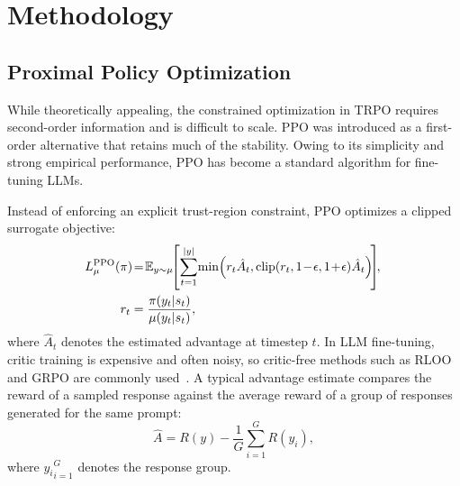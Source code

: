 \section{Methodology}  
\label{sec:method}  

\subsection{Proximal Policy Optimization}  

While theoretically appealing, the constrained optimization in TRPO requires second-order information and is difficult to scale. PPO \citep{schulman2017proximal} was introduced as a first-order alternative that retains much of the stability. Owing to its simplicity and strong empirical performance, PPO has become a standard algorithm for fine-tuning LLMs.

Instead of enforcing an explicit trust-region constraint, PPO optimizes a clipped surrogate objective:
\begin{align}    
\! L^{\mathrm{PPO}}_{\rolloutpi}({\trainerpi}) \! &= \! \mathbb{E}_{y \sim \rolloutpi} \!\! \left[ \sum_{t=1}^{|y|} \! \min \! \left( r_t \hat{A}_t, \operatorname{clip}(r_t, 1 \! - \! \epsilon, 1 \! + \! \epsilon) \hat{A}_t \right) \! \right] \!\!, \nonumber \\
r_t &= \frac{\trainerpi(y_t | s_t)}{\rolloutpi(y_t | s_t)},
\label{eq:ppo-clip}
\end{align}    
where $\hat{A}_t$ denotes the estimated advantage at timestep $t$. In LLM fine-tuning, critic training is expensive and often noisy, so critic-free methods such as RLOO and GRPO are commonly used~\citep{ahmadian2024back, shao2024deepseekmath, liu2025understanding}. A typical advantage estimate compares the reward of a sampled response against the average reward of a group of responses generated for the same prompt:
\[
    \hat{A} = R(y) - \frac{1}{G}\sum_{i=1}^{G} R({y_i}),
\]
where ${y_i}_{i=1}^G$ denotes the response group.


